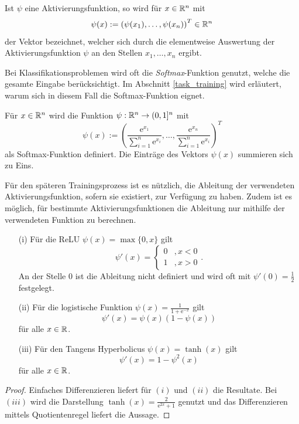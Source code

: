 \begin{bem}
    Ist $\psi$ eine Aktivierungsfunktion, so wird für $x \in \mathbb{R}^n$ mit 
    \[\psi(x):=\left(\psi(x_1), \ldots, \psi(x_n)\right)^T \in \mathbb{R}^n
    \]
    der Vektor bezeichnet, welcher sich durch die elementweise Auswertung der Aktivierungsfunktion $\psi$ an den Stellen $x_1, \ldots, x_n$ ergibt. 
\end{bem}

Bei Klassifikationsproblemen wird oft die \textit{Softmax}-Funktion\cite{denker1990transforming} genutzt, welche die gesamte Eingabe berücksichtigt. Im Abschnitt \ref{task_training} wird erläutert, warum sich in diesem Fall die Softmax-Funktion eignet.

\begin{defi}[Softmax]
    Für $x \in \mathbb{R}^n$ wird die Funktion $\psi: \mathbb{R}^n \rightarrow (0,1]^n$ mit 
    \[
        \psi(x):=\left(\frac{\mathrm{e}^{x_1}}{\sum_{i=1}^n \mathrm{e}^{x_i}}, \ldots,\frac{\mathrm{e}^{x_n}}{\sum_{i=1}^n \mathrm{e}^{x_i}} \right)^T
    \]
    als Softmax-Funktion definiert. Die Einträge des Vektors $\psi(x)$ summieren sich zu Eins.  
\end{defi}

Für den späteren Trainingsprozess ist es nützlich, die Ableitung der verwendeten Aktivierungsfunktion, sofern sie existiert, zur Verfügung zu haben. Zudem ist es möglich, für bestimmte Aktivierungsfunktionen die Ableitung nur mithilfe der verwendeten Funktion zu berechnen.

\begin{lem}
    \begin{itemize}
        \item[(i)] Für die ReLU $\psi(x)=\max\{0,x\}$ gilt
         \[\psi'(x)=\begin{cases}
            0 &, x <0 \\
            1 &, x >0
        \end{cases}. 
        \]
        An der Stelle 0 ist die Ableitung nicht definiert und wird oft mit $\psi'(0)=\frac{1}{2}$ festgelegt.
        \item[(ii)] Für die logistische Funktion $\psi(x)=\frac{1}{1+\mathrm{e}^{-x}}$ gilt
        \[ 
            \psi'(x)=\psi(x)(1-\psi(x)) 
        \]
        für alle $x \in \mathbb{R}$.
        \item[(iii)] Für den Tangens Hyperbolicus $\psi(x)=\tanh(x)$ gilt
        \[ 
            \psi'(x)=1-\psi^2(x) 
        \]
        für alle $x \in \mathbb{R}$.
    \end{itemize}
\end{lem}
\begin{proof}
    Einfaches Differenzieren liefert für $(i)$ und $(ii)$ die Resultate. Bei $(iii)$ wird die Darstellung $\tanh(x)=\frac{2}{\mathrm{e}^{2x}+1}$ genutzt und das Differenzieren mittels Quotientenregel liefert die Aussage.
\end{proof}


